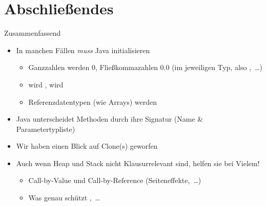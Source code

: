 \section{Abschließendes}
{\SummaryFrame
\begin{frame}[t]{Zusammenfassend}
\pause \printBibCommand
\vfill\vfill %
\begin{itemize}[<+(1)->]
    \itemsep6.5pt
    \item In manchen Fällen \textit{muss} Java initialisieren  \begin{itemize}
        \item Ganzzahlen werden \(0\), Fließkommazahlen \(0.0\) (im jeweiligen Typ, also ,~\ldots)
        \item {} wird ,  wird  
        \item Referenzdatentypen (wie Arrays) werden 
    \end{itemize}
    \item Java unterscheidet Methoden durch ihre Signatur (Name \& Parametertypliste)
    \item Wir haben einen Blick auf Clone(s) geworfen 
    \item Auch wenn Heap und Stack nicht Klausurrelevant sind, helfen sie bei Vielem! \begin{itemize}
        \item Call-by-Value und Call-by-Reference (Seiteneffekte,~\ldots)
        \item Was genau schützt ,~\ldots
    \end{itemize}
\end{itemize}
\end{frame}
}



\iffull\fi
